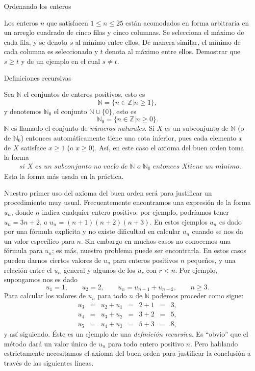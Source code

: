 \begin{section}{Ordenando los enteros}
\begin{enumex}
    \item Los enteros $n$ que satisfacen $1 \le n \le 25$ están acomodados en forma arbitraria en un arreglo cuadrado de cinco filas y cinco columnas. Se selecciona el máximo  de cada fila, y se denota $s$ al mínimo entre ellos. De manera similar, el mínimo de cada columna es seleccionado y $t$ denota al máximo entre ellos. Demostrar que $s\ge t$ y de un ejemplo en el cual $s\not=t$.
\end{enumex}

\end{section}

\begin{section}{Definiciones recursivas}\label{seccion-definiciones-recursivas}

Sea $\mathbb N$ el conjuntos de enteros positivos, esto es
$$
\mathbb N = \{ n \in \mathbb Z | n\ge 1\},
$$
y denotemos $\mathbb N_0$ el conjunto $\mathbb N \cup \{0\}$, esto
es
$$
\mathbb N_0 = \{ n \in \mathbb Z | n\ge 0\}.
$$
$\mathbb{N}$  es llamado el conjunto de  \textit{números naturales}. Si $X$ es un subconjunto de $\mathbb N$ (o de $\mathbb N_0$)  entonces automáticamente tiene una cota inferior, pues cada elemento $x$ de $X$ satisface $x\ge 1$ (o $x\ge 0$). As{í}, en este caso el axioma del buen orden toma la forma
$$
\begin{aligned}
&\textit{si $X$ es un subconjunto no vacío de $\mathbb N$ o $\mathbb N_0$ entonces $X$
 tiene un mínimo.}
\end{aligned}
$$
Esta la forma más usada en la práctica.

Nuestro primer uso del axioma del buen orden será para justificar un procedimiento muy usual. Frecuentemente encontramos una expresión de la forma $u_n$, donde $n$ indica cualquier entero positivo: por ejemplo, podríamos tener $u_n=3n+2$, o $u_n = (n+1)(n+2)(n+3)$. En estos ejemplos $u_n$ es dado por una fórmula explícita y no existe dificultad en calcular $u_n$ cuando se nos da un valor específico para $n$. Sin embargo en muchos casos no conocemos una fórmula para $u_n$; es más, nuestro problema puede ser encontrarla. En estos casos pueden darnos ciertos valores de $u_n$ para enteros positivos $n$ peque\~nos, y una relación entre el $u_n$ general y algunos de los $u_r$ con $r<n$. Por ejemplo, supongamos nos es dado 
$$ 
u_1=1, \qquad u_2=2, \qquad u_n =u_{n-1} +u_{n-2}, \qquad n\ge 3.
$$
Para calcular los valores de $u_n$ para todo $n$ de $\mathbb N$ podemos proceder como sigue:
$$
\begin{matrix}
u_3 & = & u_2 + u_1 & = & 2+1 &=& 3, \\
u_4 & = & u_3 + u_2 & = & 3+2 &=& 5, \\
u_5 & = & u_4 + u_3 & = & 5+3 &=& 8,
\end{matrix}
$$
y así siguiendo.  Éste es un ejemplo de una \textit{definición recursiva}. Es ``obvio'' que el método dará un valor único de $u_n$ para todo entero positivo $n$. Pero hablando estrictamente necesitamos el axioma del buen orden para justificar la conclusión a través de las siguientes líneas.


\end{section}
